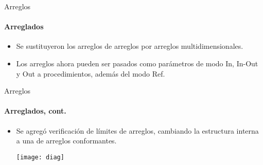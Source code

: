 \begin{frame}{Arreglos}
\framesubtitle{Arreglados}
\begin{itemize}
  \item Se sustituyeron los arreglos de arreglos por arreglos multidimensionales. \multidim{}

  \item Los arreglos ahora pueden ser pasados como parámetros de modo In, In-Out y Out a procedimientos, además del modo Ref. \inoutarr{}

\end{itemize}
\end{frame}
\begin{frame}{Arreglos}
\framesubtitle{Arreglados, cont.}
\begin{itemize}

  \item Se agregó verificación de límites de arreglos, cambiando la estructura interna a una de arreglos conformantes. \limits{} 

  \begin{center}
  \texttt{[image: diag]}
  \end{center}

\end{itemize}
\end{frame}


\cnfquant{
\begin{lstlisting}[language=graciela, style=code, escapechar=\~]
(% ~\qop~ i : int | 0 < i /\ i < 100 /\ (p(i) \/ q(i)) | ... %)
(% ~\qop~ x : float | x ~\Elem~ xs | ... %)
\end{lstlisting}
}

\countquant{
\begin{lstlisting}[language=graciela, style=code, escapechar=\~]
(% # i : T | R(i) | P(i) %)
\end{lstlisting}
}


